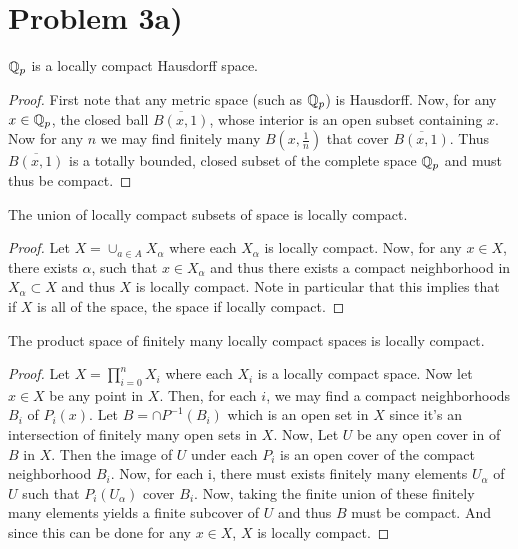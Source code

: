 \section*{Problem 3a)}
\begin{lemma}
$\mathbb{Q}_p$ is a locally compact Hausdorff space. 
\begin{proof}
First note that any metric space (such as $\mathbb{Q}_p$) is Hausdorff.  Now, for any $x\in \mathbb{Q}_p$, the closed ball $\overline{B(x,1)}$, whose interior is an open subset containing $x$. Now for any $n$ we may find finitely many $B(x,\frac{1}{n})$ that cover $\overline{B(x,1)}$. Thus $\overline{B(x,1)}$ is a totally bounded, closed subset of the complete space $\mathbb{Q}_p$ and must thus be compact. 
\end{proof}
\end{lemma}
\begin{lemma}
The union of locally compact subsets of space is locally compact. 
\begin{proof}
Let $X=\cup_{a\in A} X_\alpha$ where each $X_\alpha$ is locally compact. Now, for any $x\in X$, there exists $\alpha$, such that $x\in X_\alpha$ and thus there exists a compact neighborhood in $X_\alpha \subset X$ and thus $X$ is locally compact. 
Note in particular that this implies that if $X$ is all of the space, the space if locally compact. 
\end{proof}
\end{lemma}
\begin{lemma}
The product space of finitely many locally compact spaces is locally compact. 
\begin{proof}
Let $X=\prod_{i=0}^n X_i$ where each $X_i$ is a locally compact space. Now let $x\in X$ be any point in $X$. Then, for each $i$, we may find a compact neighborhoods $B_i$ of $P_i(x)$. 
Let $B = \cap P^{-1}(B_i)$ which is an open set in $X$ since it's an intersection of finitely many open sets in $X$. Now, Let $U$ be any open cover in of $B$ in $X$. Then the image of $U$ under each $P_i$ is an open cover of the compact neighborhood $B_i$. Now, for each i, there must exists finitely many elements $U_\alpha$ of $U$ such that $P_i(U_\alpha)$ cover $B_i$. Now, taking the finite union of these finitely many elements yields a finite subcover of $U$ and thus $B$ must be compact. And since this can be done for any $x\in X$, $X$ is locally compact. 
\end{proof}
\end{lemma}
